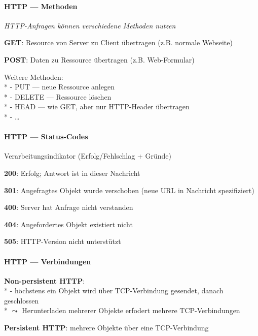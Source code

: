 \paragraph{HTTP --- Methoden}
\begin{items}
  \item \emph{HTTP-Anfragen können verschiedene Methoden nutzen}
  \item \textbf{GET}: Resource von Server zu Client übertragen (z.B. normale Webseite)
  \item \textbf{POST}: Daten zu Ressource übertragen (z.B. Web-Formular)
  \item Weitere Methoden: \\*
    - PUT --- neue Ressource anlegen \\*
    - DELETE --- Ressource löschen \\*
    - HEAD --- wie GET, aber nur HTTP-Header übertragen \\*
    - \dots
\end{items}

\paragraph{HTTP --- Status-Codes}
\begin{items}
  \item Verarbeitungsindikator (Erfolg/Fehlschlag + Gründe)
  \item \textbf{200}: Erfolg; Antwort ist in dieser Nachricht
  \item \textbf{301}: Angefragtes Objekt wurde verschoben (neue URL in Nachricht spezifiziert)
  \item \textbf{400}: Server hat Anfrage nicht verstanden
  \item \textbf{404}: Angefordertes Objekt existiert nicht
  \item \textbf{505}: HTTP-Version nicht unterstützt
\end{items}

\paragraph{HTTP --- Verbindungen}
\begin{items}
  \item \textbf{Non-persistent HTTP}: \\*
    - höchstens ein Objekt wird über TCP-Verbindung gesendet, danach geschlossen \\*
    \phantom{-} \( \leadsto \) Herunterladen mehrerer Objekte erfodert mehrere TCP-Verbindungen
  \item \textbf{Persistent HTTP}: mehrere Objekte über eine TCP-Verbindung
\end{items}

